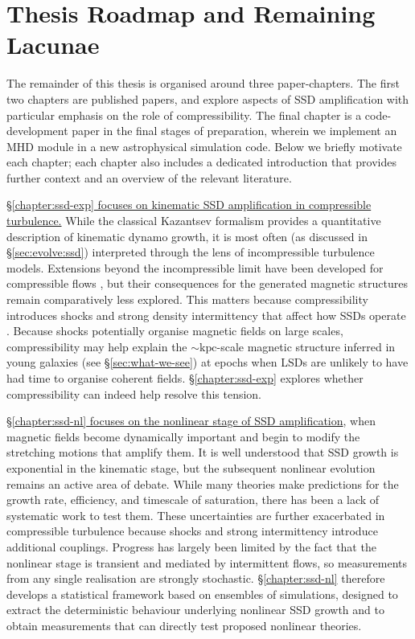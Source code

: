 



\section{Thesis Roadmap and Remaining Lacunae}
\label{sec:intro:roadmap}

The remainder of this thesis is organised around three paper-chapters. The first two chapters are published papers, and explore aspects of SSD amplification with particular emphasis on the role of compressibility. The final chapter is a code-development paper in the final stages of preparation, wherein we implement an MHD module in a new astrophysical simulation code. Below we briefly motivate each chapter; each chapter also includes a dedicated introduction that provides further context and an overview of the relevant literature.

\uline{\S\ref{chapter:ssd-exp} focuses on kinematic SSD amplification in compressible turbulence.} While the classical Kazantsev formalism provides a quantitative description of kinematic dynamo growth, it is most often (as discussed in \S\ref{sec:evolve:ssd}) interpreted through the lens of incompressible turbulence models. Extensions beyond the incompressible limit have been developed for compressible flows \citep[\eg][]{schober2012magnetic, bovino2013turbulent}, but their consequences for the generated magnetic structures remain comparatively less explored. This matters because compressibility introduces shocks and strong density intermittency that affect how SSDs operate \citep{federrath2016magnetic}. Because shocks potentially organise magnetic fields on large scales, compressibility may help explain the $\sim \mathrm{kpc}$-scale magnetic structure inferred in young galaxies (see \S\ref{sec:what-we-see}) at epochs when LSDs are unlikely to have had time to organise coherent fields. \S\ref{chapter:ssd-exp} explores whether compressibility can indeed help resolve this tension.

\uline{\S\ref{chapter:ssd-nl} focuses on the nonlinear stage of SSD amplification}, when magnetic fields become dynamically important and begin to modify the stretching motions that amplify them. It is well understood that SSD growth is exponential in the kinematic stage, but the subsequent nonlinear evolution remains an active area of debate. While many theories make predictions for the growth rate, efficiency, and timescale of saturation, there has been a lack of systematic work to test them. These uncertainties are further exacerbated in compressible turbulence because shocks and strong intermittency introduce additional couplings. Progress has largely been limited by the fact that the nonlinear stage is transient and mediated by intermittent flows, so measurements from any single realisation are strongly stochastic. \S\ref{chapter:ssd-nl} therefore develops a statistical framework based on ensembles of simulations, designed to extract the deterministic behaviour underlying nonlinear SSD growth and to obtain measurements that can directly test proposed nonlinear theories.

